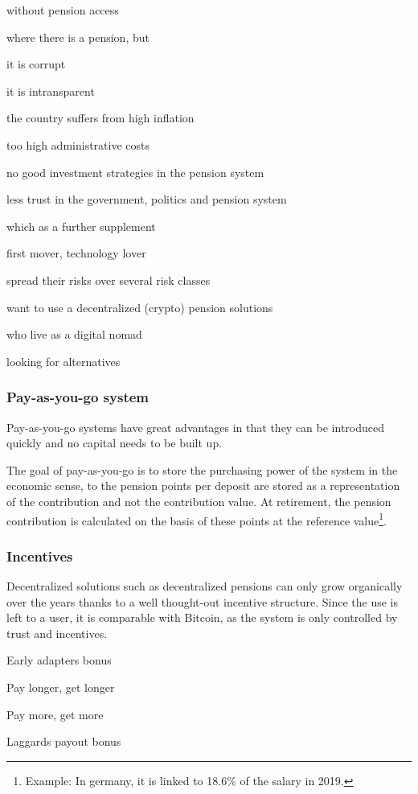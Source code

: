 \begin{compactitem}
\item without pension access
\item where there is a pension, but
 \begin{compactitem}
 \item it is corrupt
 \item it is intransparent
 \item the country suffers from high inflation
 \item too high administrative costs
 \item no good investment strategies in the pension system
 \item less trust in the government, politics and pension system
 \end{compactitem}
\item which as a further supplement 
 \begin{compactitem}
 \item first mover, technology lover
 \item spread their risks over several risk classes
 \item want to use a decentralized (crypto) pension solutions
 \item who live as a digital nomad
 \item looking for alternatives
 \end{compactitem}
\end{compactitem}

\subsubsection{Pay-as-you-go system}


Pay-as-you-go systems have great advantages in that they can be introduced quickly and no capital needs to be built up.

The goal of pay-as-you-go is to store the purchasing power of the system in the economic sense, to the pension points per deposit are stored as a representation of the contribution and not the contribution value.
At retirement, the pension contribution is calculated on the basis of these points at the reference value\footnote{Example: In germany, it is linked to 18.6\% of the salary in 2019.}.


\subsubsection{Incentives}
Decentralized solutions such as decentralized pensions can only grow organically over the years thanks to a well thought-out incentive structure. Since the use is left to a user, it is comparable with Bitcoin\cite{nakamoto2012bitcoin}, as the system is only controlled by trust and incentives.
\begin{compactitem}
 \item Early adapters bonus
 \item Pay longer, get longer
 \item Pay more, get more
 \item Laggards payout bonus
\end{compactitem}


